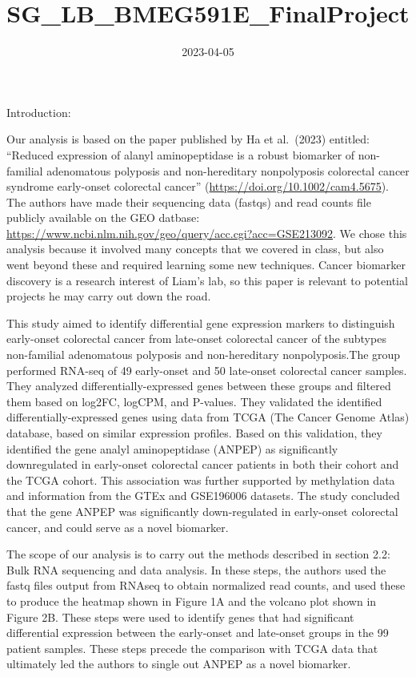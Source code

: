 \documentclass[
]{article}
\title{SG\_LB\_BMEG591E\_FinalProject}
\author{}
\date{\vspace{-2.5em}2023-04-05}
\begin{document}
\maketitle

Introduction:

Our analysis is based on the paper published by Ha et al.~(2023)
entitled: ``Reduced expression of alanyl aminopeptidase is a robust
biomarker of non-familial adenomatous polyposis and non-hereditary
nonpolyposis colorectal cancer syndrome early-onset colorectal cancer''
(\url{https://doi.org/10.1002/cam4.5675}). The authors have made their
sequencing data (fastqs) and read counts file publicly available on the
GEO datbase:
\url{https://www.ncbi.nlm.nih.gov/geo/query/acc.cgi?acc=GSE213092}. We
chose this analysis because it involved many concepts that we covered in
class, but also went beyond these and required learning some new
techniques. Cancer biomarker discovery is a research interest of Liam's
lab, so this paper is relevant to potential projects he may carry out
down the road.

This study aimed to identify differential gene expression markers to
distinguish early-onset colorectal cancer from late-onset colorectal
cancer of the subtypes non-familial adenomatous polyposis and
non-hereditary nonpolyposis.The group performed RNA-seq of 49
early-onset and 50 late-onset colorectal cancer samples. They analyzed
differentially-expressed genes between these groups and filtered them
based on log2FC, logCPM, and P-values. They validated the identified
differentially-expressed genes using data from TCGA (The Cancer Genome
Atlas) database, based on similar expression profiles. Based on this
validation, they identified the gene analyl aminopeptidase (ANPEP) as
significantly downregulated in early-onset colorectal cancer patients in
both their cohort and the TCGA cohort. This association was further
supported by methylation data and information from the GTEx and
GSE196006 datasets. The study concluded that the gene ANPEP was
significantly down-regulated in early-onset colorectal cancer, and could
serve as a novel biomarker.

The scope of our analysis is to carry out the methods described in
section 2.2: Bulk RNA sequencing and data analysis. In these steps, the
authors used the fastq files output from RNAseq to obtain normalized
read counts, and used these to produce the heatmap shown in Figure 1A
and the volcano plot shown in Figure 2B. These steps were used to
identify genes that had significant differential expression between the
early-onset and late-onset groups in the 99 patient samples. These steps
precede the comparison with TCGA data that ultimately led the authors to
single out ANPEP as a novel biomarker.
\end{document}
